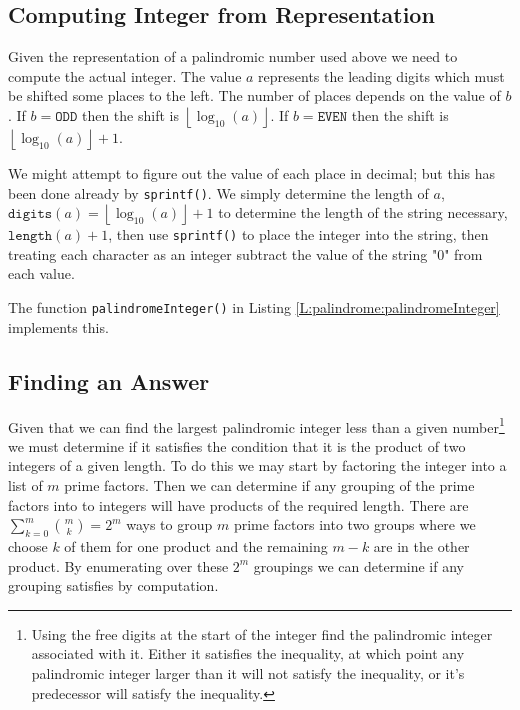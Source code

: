 \documentclass[oneside,12pt]{book}   	%
\newcounter{ex}
\newcounter{pr}
\theoremstyle{definition}
\newcommand{\floor}[1]{\left\lfloor #1 \right\rfloor}
\begin{document}
\begin{spacing}{1.618}
				

			\subsection{Computing Integer from Representation}
			
				Given the representation of a palindromic number used above we need to compute the actual integer. The value $a$ represents the leading digits which must be shifted some places to the left. The number of places depends on the value of $b$. If $b=\mathtt{ODD}$ then the shift is $\floor{\log_{10}(a)}$. If $b=\mathtt{EVEN}$ then the shift is $\floor{\log_{10}(a)}+1$. 
				
				We might attempt to figure out the value of each place in decimal; but this has been done already by \texttt{sprintf()}. We simply determine the length of $a$, $\mathtt{digits}(a)=\floor{\log_{10}(a)}+1$ to determine the length of the string necessary, $\mathtt{length}(a)+1$, then use \texttt{sprintf()} to place the integer into the string, then treating each character as an integer subtract the value of the string "0" from each value. 
				
				The function \texttt{palindromeInteger()} in Listing \ref{L:palindrome:palindromeInteger} implements this. 
				
				

			\subsection{Finding an Answer}
			
				Given that we can find the largest palindromic integer less than a given number\footnote{Using the free digits at the start of the integer find the palindromic integer associated with it. Either it satisfies the inequality, at which point any palindromic integer larger than it will not satisfy the inequality, or it's predecessor will satisfy the inequality.} we must determine if it satisfies the condition that it is the product of two integers of a given length. To do this we may start by factoring the integer into a list of $m$ prime factors. Then we can determine if any grouping of the prime factors into to integers will have products of the required length. There are $\sum_{k=0}^m\binom{m}{k}=2^m$ ways to group $m$ prime factors into two groups where we choose $k$ of them for one product and the remaining $m-k$ are in the other product. By enumerating over these $2^m$ groupings we can determine if any grouping satisfies by computation. 
				
				

\end{spacing}
\end{document}
